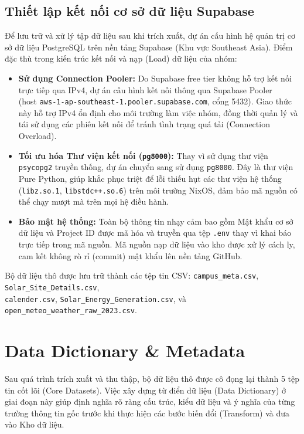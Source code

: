 \documentclass[12pt, a4paper]{report}
\begin{document}
\subsection{Thiết lập kết nối cơ sở dữ liệu Supabase}
Để lưu trữ và xử lý tập dữ liệu sau khi trích xuất, dự án cấu hình hệ quản trị cơ sở dữ liệu PostgreSQL trên nền tảng Supabase (Khu vực Southeast Asia). Điểm đặc thù trong kiến trúc kết nối và nạp (Load) dữ liệu của nhóm:
\begin{itemize}[noitemsep]
    \item \textbf{Sử dụng Connection Pooler:} Do Supabase free tier không hỗ trợ kết nối trực tiếp qua IPv4, dự án cấu hình kết nối thông qua Supabase Pooler \\(host \texttt{aws-1-ap-southeast-1.pooler.supabase.com}, cổng 5432). Giao thức này hỗ trợ IPv4 ổn định cho môi trường làm việc nhóm, đồng thời quản lý và tái sử dụng các phiên kết nối để tránh tình trạng quá tải (Connection Overload).
    \item \textbf{Tối ưu hóa Thư viện kết nối (\texttt{pg8000}):} Thay vì sử dụng thư viện \texttt{psycopg2} truyền thống, dự án chuyển sang sử dụng \texttt{pg8000}. Đây là thư viện Pure Python, giúp khắc phục triệt để lỗi thiếu hụt các thư viện hệ thống (\texttt{libz.so.1}, \texttt{libstdc++.so.6}) trên môi trường NixOS, đảm bảo mã nguồn có thể chạy mượt mà trên mọi hệ điều hành.
    \item \textbf{Bảo mật hệ thống:} Toàn bộ thông tin nhạy cảm bao gồm Mật khẩu cơ sở dữ liệu và Project ID được mã hóa và truyền qua tệp \texttt{.env} thay vì khai báo trực tiếp trong mã nguồn. Mã nguồn nạp dữ liệu vào kho được xử lý cách ly, cam kết không rò rỉ (commit) mật khẩu lên nền tảng GitHub.
\end{itemize}
Bộ dữ liệu thô được lưu trữ thành các tệp tin CSV: \texttt{campus\_meta.csv}, \texttt{Solar\_Site\_Details.csv},\\ \texttt{calender.csv}, \texttt{Solar\_Energy\_Generation.csv}, và \texttt{open\_meteo\_weather\_raw\_2023.csv}.

\section{Data Dictionary \& Metadata}
\label{sec:data_dictionary}

Sau quá trình trích xuất và thu thập, bộ dữ liệu thô được cô đọng lại thành 5 tệp tin cốt lõi (Core Datasets). Việc xây dựng từ điển dữ liệu (Data Dictionary) ở giai đoạn này giúp định nghĩa rõ ràng cấu trúc, kiểu dữ liệu và ý nghĩa của từng trường thông tin gốc trước khi thực hiện các bước biến đổi (Transform) và đưa vào Kho dữ liệu.
\end{document}
